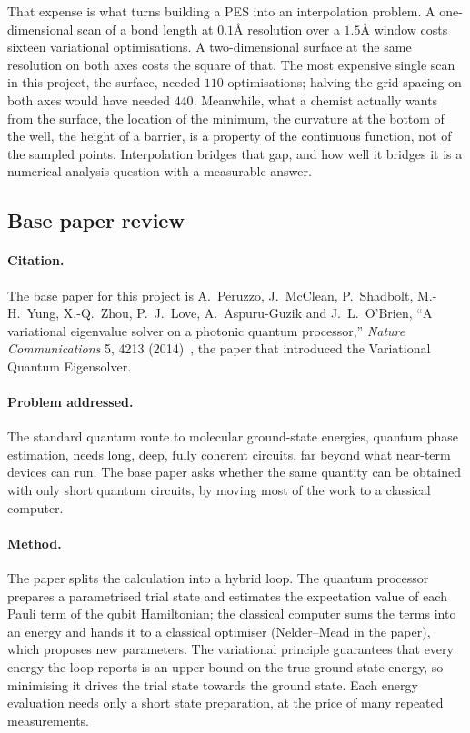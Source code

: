 \documentclass[sigconf,screen,nonacm]{acmart}
\newcommand{\Ang}{\text{\AA}}
\begin{document}
That expense is what turns building a PES into an interpolation problem. A
one-dimensional scan of a bond length at $0.1\Ang$ resolution over a
$1.5\Ang$ window costs sixteen variational optimisations. A two-dimensional
surface at the same resolution on both axes costs the square of that. The
most expensive single scan in this project, the  surface, needed
$110$ optimisations; halving the grid spacing on both axes would have needed
$440$. Meanwhile, what a chemist actually wants from the surface, the
location of the minimum, the curvature at the bottom of the well, the height
of a barrier, is a property of the continuous function, not of the sampled
points. Interpolation bridges that gap, and how well it bridges it is a
numerical-analysis question with a measurable answer.

\subsection{Base paper review}
\label{sec:basepaper}

\paragraph{Citation.}
The base paper for this project is A.~Peruzzo, J.~McClean, P.~Shadbolt,
M.-H.~Yung, X.-Q.~Zhou, P.~J.~Love, A.~Aspuru-Guzik and J.~L.~O'Brien,
``A variational eigenvalue solver on a photonic quantum processor,''
\emph{Nature Communications} 5, 4213 (2014)~\cite{peruzzo2014}, the paper
that introduced the Variational Quantum Eigensolver.

\paragraph{Problem addressed.}
The standard quantum route to molecular ground-state energies, quantum phase
estimation, needs long, deep, fully coherent circuits, far beyond what
near-term devices can run. The base paper asks whether the same quantity can
be obtained with only short quantum circuits, by moving most of the work to a
classical computer.

\paragraph{Method.}
The paper splits the calculation into a hybrid loop. The quantum processor
prepares a parametrised trial state and estimates the expectation value of
each Pauli term of the qubit Hamiltonian; the classical computer sums the
terms into an energy and hands it to a classical optimiser (Nelder--Mead in the
paper), which proposes new parameters. The variational principle guarantees
that every energy the loop reports is an upper bound on the true ground-state
energy, so minimising it drives the trial state towards the ground state. Each
energy evaluation needs only a short state preparation, at the price of many
repeated measurements.
\end{document}
